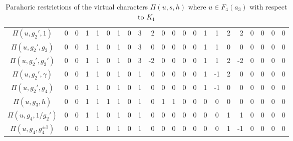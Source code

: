 \begin{landscape}
\begin{table}[ht]
{\begin{tabular}{|c|ccccc|cccR|cccR|cccR|cccR|}
        $\Pi(u,g_2',1)$ & 0 & 0 & 1 & 1 & 0 & 1 & 0 & {3} & 2 & 0 & 0 & 0 & 0 & 1 & 1 & 2 & 2 & 0 & 0 & 0 & 0 \\
        $\Pi(u,g_2',g_2)$ &  0 & 0 & 1 & 1 & 0 & 1 & 0 & {3} & 0 & 0 & 0 & 0 & 0 & 1 & 1 & 0 & 0 & 0 & 0 & 0 & 0 \\
        $\Pi(u,g_2',g_2')$ & 0 & 0 & 1 & 1 & 0 & 1 & 0 & {3} & {-2} & 0 & 0 & 0 & 0 & 1 & 1 & 2 & {-2} & 0 & 0 & 0 & 0 \\
        $\Pi(u,g_2',\gamma)$ & 0 & 0 & 1 & 1 & 0 & 1 & 0 & 1 & 0 & 0 & 0 & 0 & 0 & 1 & {-1} & 2 & 0 & 0 & 0 & 0 & 0 \\
        $\Pi(u,g_2',g_4)$ & 0 & 0 & 1 & 1 & 0 & 1 & 0 & 1 & 0 & 0 & 0 & 0 & 0 & 1 & {-1} & 0 & 0 & 0 & 0 & 0 & 0 \\\hline
        $\Pi(u,g_3,h)$ & 0 & 0 & 1 & 1 & 1 & 1 & 0 & 1 & 0 & 1 & 1 & 0 & 0 & 0 & 0 & 0 & 0 & 0 & 0 & 0 & 0 \\\hline
        $\Pi(u,g_4,1/g_2')$ & 0 & 0 & 1 & 1 & 0 & 1 & 0 & 1 & 0 & 0 & 0 & 0 & 0 & 0 & 0 & 1 & 1 & 0 & 0 & 0 & 0 \\
        $\Pi(u,g_4,g_4^{\pm1})$ & 0 & 0 & 1 & 1 & 0 & 1 & 0 & 1 & 0 & 0 & 0 & 0 & 0 & 0 & 0 & 1 & {-1} & 0 & 0 & 0 & 0 \\\hline
        \end{tabular}
        }
        \caption{Parahoric restrictions of the virtual characters $\Pi(u,s,h)$ where $u\in F_4(a_3)$ with respect to $K_1$}
    \end{table}
    \fi

    \newpage


\end{landscape}
